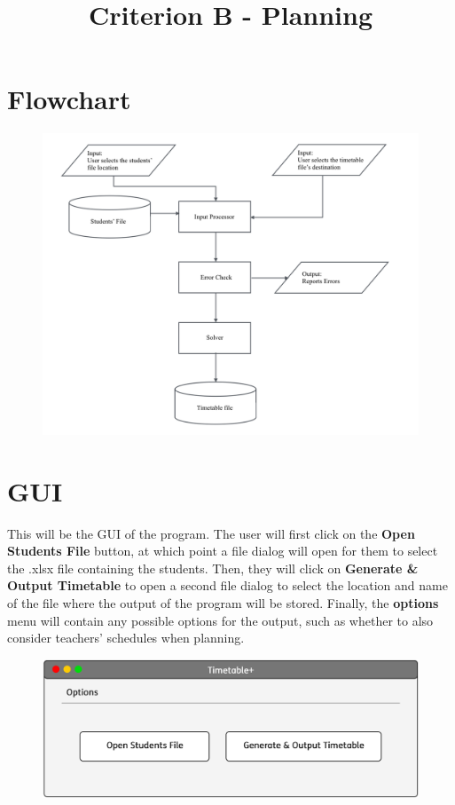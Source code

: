 \documentclass[12pt]{article}
\title{Criterion B - Planning}
\author{}
\date{}
\begin{document}
\maketitle

\section*{Flowchart}
%
\begin{figure}[H]
    \centering
    \includegraphics[width=\textwidth]{system_flowchart}
\end{figure}
%
\section*{GUI}

This will be the GUI of the program. The user will first click on the \textbf{Open Students
File} button, at which point a file dialog will open for them to select the .xlsx file
containing the students. Then, they will click on \textbf{Generate \& Output Timetable} to
open a second file dialog to select the location and name of the file where the output of
the program will be stored. Finally, the \textbf{options} menu will contain any possible
options for the output, such as whether to also consider teachers' schedules when planning. 
%
\begin{figure}[H]
    \centering
    \includegraphics[width=\textwidth]{interface_design}
\end{figure}
%
\end{document}
